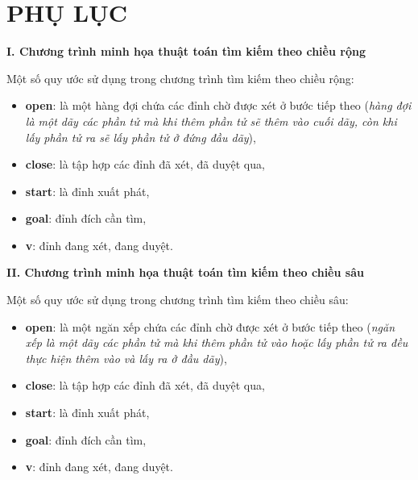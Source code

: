 \chapter*{PHỤ LỤC}
\label{Appendix}
\thispagestyle{fancy}
\renewcommand*{\thepage}{$\text{A}_{\arabic{page}}$}
\appendix

\noindent
{\bf I. Chương trình minh họa thuật toán tìm kiếm theo chiều rộng}

Một số quy ước sử dụng trong chương trình tìm kiếm theo chiều rộng:
\begin{itemize}
	\item {\bf open}: là một hàng đợi chứa các đỉnh chờ được xét ở bước tiếp theo ({\em hàng đợi là một dãy các phần tử mà khi thêm phần tử sẽ thêm vào cuối dãy, còn khi lấy phần tử ra sẽ lấy phần tử ở đứng đầu dãy}),
	\item {\bf close}: là tập hợp các đỉnh đã xét, đã duyệt qua,
	\item {\bf start}: là đỉnh xuất phát,
	\item {\bf goal}: đỉnh đích cần tìm,
	\item {\bf v}: đỉnh đang xét, đang duyệt.
\end{itemize}

\renewcommand{\baselinestretch}{1.15}


\renewcommand{\baselinestretch}{1.3}
\noindent
{\bf II. Chương trình minh họa thuật toán tìm kiếm theo chiều sâu}

Một số quy ước sử dụng trong chương trình tìm kiếm theo chiều sâu:
\begin{itemize}
	\item {\bf open}: là một ngăn xếp chứa các đỉnh chờ được xét ở bước tiếp theo ({\em ngăn xếp là một dãy các phần tử mà khi thêm phần tử vào hoặc lấy phần tử ra đều thực hiện thêm vào và lấy ra ở đầu dãy}),
	\item {\bf close}: là tập hợp các đỉnh đã xét, đã duyệt qua,
	\item {\bf start}: là đỉnh xuất phát,
	\item {\bf goal}: đỉnh đích cần tìm,
	\item {\bf v}: đỉnh đang xét, đang duyệt.
\end{itemize}

